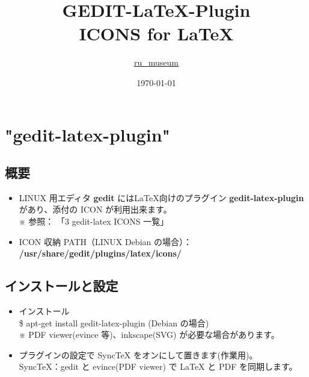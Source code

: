 \documentclass[a5j,10pt]{ltjarticle}
\title{{\fs{24.88}GEDIT-LaTeX-Plugin \\ ICONS for \LaTeX{}}\\ \vspace{10mm}{\fs{12} \textbf{[ PNG 版 ]}}\vspace{80mm}}
\author{\href{https://github.com/ru-museum/}{ru\_museum \bsgithub}}
\date{\today}
\def\fs#1{\fontsize{#1pt}{14pt}\selectfont}
\begin{document}
\begin{titlepage}
  \maketitle
	\vspace{\fill}
\thispagestyle{empty}
\end{titlepage}

\newpage

\tableofcontents
\clearpage

\newpage

\section{"gedit-latex-plugin"}
\subsection{概要}

\begin{itemize}
  \item LINUX 用エディタ \textbf{gedit} には\LaTeX{}向けのプラグイン \textbf{gedit-latex-plugin} があり、添付の ICON が利用出来ます。\\ 
※ 参照： 「3 gedit-latex ICONS 一覧」
  
  \item ICON 収納 PATH（LINUX Debian の場合）：\\
  \textbf{/usr/share/gedit/plugins/latex/icons/} 

\end{itemize}

\subsection{インストールと設定}

\begin{itemize}
  \item インストール\\ 
        \$ apt-get install gedit-latex-plugin (Debian の場合) \\
        {\fs{8} ※ PDF viewer(evince 等)、inkscape(SVG) が必要な場合があります。} 
\vspace{-2mm}
  \item プラグインの設定で SyncTeX をオンにして置きます(作業用)。\\ 
{\fs{8}SyncTeX：gedit と evince(PDF viewer) で LaTeX と PDF を同期します。}
\end{itemize}
\end{document}
